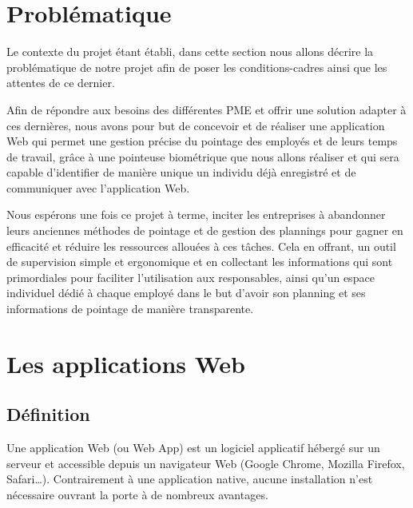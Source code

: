 \section{Problématique}
Le contexte du projet étant établi, dans cette section nous allons décrire la
problématique de notre projet afin de poser les conditions-cadres ainsi que les
attentes de ce dernier.

Afin de répondre aux besoins des différentes PME et offrir une solution adapter à ces dernières, nous avons pour but de concevoir et de réaliser une application Web qui permet une
gestion précise du pointage des employés et de leurs temps de travail, grâce à une pointeuse biométrique que nous allons réaliser et qui sera
capable d’identifier de manière unique un individu déjà enregistré et de
communiquer avec l’application Web.

Nous espérons une fois ce projet à terme, inciter les entreprises à abandonner
leurs anciennes méthodes de pointage et de gestion des plannings pour gagner en
efficacité et réduire les ressources allouées à ces tâches. Cela en offrant, un outil
de supervision simple et ergonomique et en collectant les informations qui sont
primordiales pour faciliter l’utilisation aux responsables, ainsi qu’un espace
individuel dédié à chaque employé dans le but d’avoir son planning et ses
informations de pointage de manière transparente.


\section{Les applications Web}

\subsection{Définition}
Une application Web (ou Web App) est un logiciel applicatif hébergé sur un
serveur et accessible depuis un navigateur Web (Google Chrome, Mozilla Firefox,
Safari…). Contrairement à une application native, aucune installation n’est
nécessaire ouvrant la porte à de nombreux avantages.
        
